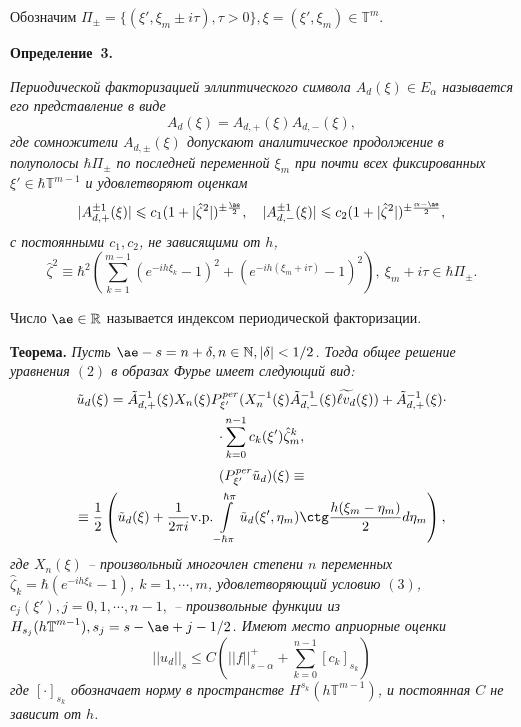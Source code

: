 Обозначим  $\Pi_{\pm}=\{(\xi',\xi_m\pm i\tau), \tau>0\}, \xi=(\xi',\xi_m)\in\mathbb T^m$.

\textbf{Определение~3.} {\it Периодической факторизацией эллиптического символа  $A_d(\xi)\in E_{\alpha}$ называется его представление в виде
\[
A_d(\xi)=A_{d,+}(\xi)A_{d,-}(\xi),
\]
где сомножители  $A_{d,\pm}(\xi)$ допускают аналитическое продолжение в полуполосы  $\hbar\Pi_{\pm}$ по последней переменной  $\xi_m$
при почти всех фиксированных  $\xi'\in\hbar{\mathbb T}^{m-1}$ и удовлетворяют оценкам
\[
|A^{\pm 1}_{d,+}(\xi)|\leqslant c_1(1+|\hat\zeta^2|)^{\pm\frac{\ae}{2}},~~~|A^{\pm 1}_{d,-}(\xi)|\leqslant c_2(1+|\hat\zeta^2|)^{\pm\frac{{\alpha-\ae}}{2}},
\]
с постоянными $c_1, c_2$, не зависящими от $h$,
\[
\hat\zeta^2\equiv\hbar^2\!\left(\sum\limits_{k=1}^{m-1}(e^{-ih\xi_k}-1)^2+(e^{-ih(\xi_m+i\tau)}-1)^2\right)\!,~\xi_m+i\tau\in\hbar\Pi_{\pm}.
\]

Число $\ae\in{\mathbb R}$ называется индексом периодической факторизации.

}

\textbf{Теорема.} {\it Пусть $\ae-s=n+\delta, n\in{\mathbb N}, |\delta|<1/2$.
Тогда общее решение уравнения  $(2)$ в образах Фурье имеет следующий вид:
\begin{multline*}
	\tilde u_d(\xi)=
	\tilde A^{-1}_{d,+}(\xi)X_n(\xi)P^{\it per}_{\xi'}(X_n^{-1}(\xi)\tilde A^{-1}_{d,-}(\xi)\widetilde{\ell v_d}(\xi)) +\tilde A^{-1}_{d,+}(\xi)
	\cdot \\ \cdot
	\sum\limits_{k=0}^{n-1}
	c_k(\xi')\hat\zeta_m^k,
\end{multline*}
\begin{multline*}
	(P_{\xi'}^{\it per}\tilde u_d)(\xi)\equiv
	\\ \equiv
	\frac{1}{2}\left(\tilde u_d(\xi)+\frac{1}{2\pi i}\mathrm{v.p.}\int\limits_{-\hbar\pi}^{\hbar\pi}{\tilde u_d(\xi',\eta_m)}\ctg\frac{h(\xi_m-\eta_m)}{2}d\eta_m\right),
\end{multline*}
где $X_n(\xi)$ -- произвольный многочлен степени  $n$ переменных $\hat\zeta_k=\hbar(e^{-ih\xi_k}-1)$, $k=1,\cdots,m$, удовлетворяющий условию  $(3)$, $c_j(\xi'), j=0,1,\cdots,n-1,$ -- произвольные функции из  $H_{s_j}({h\mathbb T}^{m-1}), s_j=s-\ae+j-1/2$. Имеют место априорные оценки
\[
||u_d||_s\leqslant C(||f||^+_{s-\alpha}+\sum\limits_{k=0}^{n-1}[c_k]_{s_k})
\]
где $[\cdot]_{s_k}$ обозначает норму в пространстве $H^{s_k}({h\mathbb T}^{m-1})$, и постоянная $C$ не зависит от $h$.
}


